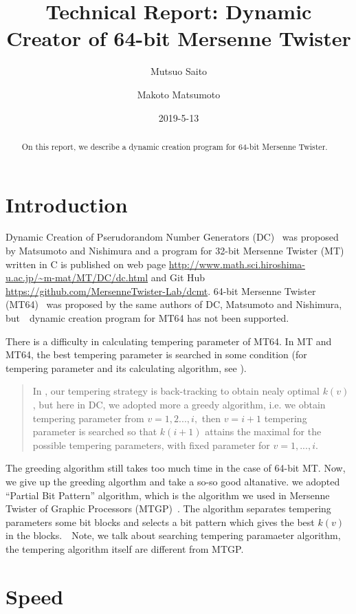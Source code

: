 \documentclass{article}
\title{Technical Report: Dynamic Creator of 64-bit Mersenne Twister}
\author{Mutsuo Saito \and Makoto Matsumoto}
\date{2019-5-13}
\begin{document}
\maketitle

\begin{abstract}
  On this report, we describe a dynamic creation program for 64-bit
  Mersenne Twister.
\end{abstract}



\section{Introduction}

Dynamic Creation of Pserudorandom Number Generators (DC)~\cite{DC} was
proposed by Matsumoto and Nishimura and a program for 32-bit Mersenne
Twister (MT)~\cite{MT} written in C is published on web page
\url{http://www.math.sci.hiroshima-u.ac.jp/~m-mat/MT/DC/dc.html} and
Git Hub \url{https://github.com/MersenneTwister-Lab/dcmt}.
64-bit Mersenne Twister (MT64)~\cite{MT64} was proposed by the same
authors of DC, Matsumoto and Nishimura, but　dynamic creation program
for MT64 has not been supported.

There is a difficulty in calculating tempering parameter of MT64.  In
MT and MT64, the best tempering parameter is searched in some
condition (for tempering parameter and its calculating algorithm, see
\cite{MT, MT64}).

\begin{quote}
  In \cite{TGFSRII}\cite{MT}, our tempering strategy is back-tracking
  to obtain nealy optimal $k(v)$, but here in DC, we adopted more a
  greedy algorithm, i.e. we obtain tempering parameter from
  $v = 1, 2 ..., i,$ then $v = i + 1$ tempering parameter is searched
  so that $k(i+1)$ attains the maximal for the possible tempering
  parameters, with fixed parameter for $v = 1, ..., i$.
\end{quote}

The greeding algorithm still takes too much time in the case of 64-bit
MT.  Now, we give up the greeding algorthm and take a so-so good
altanative. we adopted ``Partial Bit Pattern'' algorithm, which is the
algorithm we used in Mersenne Twister of Graphic Processors
(MTGP)~\cite{MTGP}.  The algorithm separates tempering parameters some
bit blocks and selects a bit pattern which gives the best $k(v)$ in
the blocks.　Note, we talk about searching tempering paramaeter
algorithm, the tempering algorithm itself are different from MTGP.

\section*{Speed}





\end{document}
